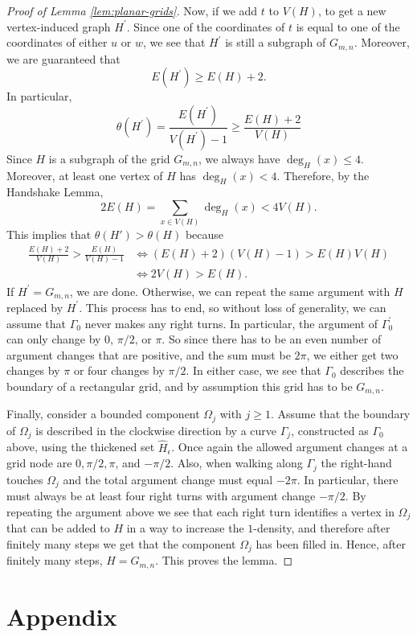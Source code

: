 \documentclass[preprint,12pt]{elsarticle}
\theoremstyle{definition}
\theoremstyle{remark}
\numberwithin{equation}{section}
\newcommand{\ep}{\epsilon }
\newcommand{\Ga}{\Gamma }
\newcommand{\Om}{\Omega }
\begin{document}
\begin{proof}[Proof of Lemma \ref{lem:planar-grids}]
Now, if we add $t$ to $V(H)$, to get a new vertex-induced graph $H^\prime$. Since one of the coordinates of $t$ is equal to one of the coordinates of either $u$ or $w$, we see that $H^\prime$ is still a subgraph of $G_{m,n}$. Moreover, we are guaranteed that 
\[
E(H^\prime)\ge E(H)+2.
\] 
In particular,
\[
\theta(H^\prime)= \frac{E(H^\prime)}{V(H^\prime)-1}\ge\frac{E(H)+2}{V(H)}
\]
Since $H$ is a subgraph of the grid $G_{m,n}$, we always have $\deg_H(x)\le 4$. Moreover, at least one vertex of $H$ has $\deg_H(x)<4$. Therefore, by the Handshake Lemma,
\[
2E(H)=\sum_{x\in V(H)}\deg_H(x)<4 V(H).
\]
This implies that $\theta(H')>\theta(H)$ because
\begin{align*}
 \frac{E(H)+2}{V(H)} >\frac{E(H)}{V(H)-1}
& \Longleftrightarrow (E(H)+2)(V(H)-1)> E(H)V(H)\\
& \Longleftrightarrow 2V(H)> E(H).
\end{align*}
If $H^\prime=G_{m,n}$, we are done. Otherwise, we can repeat the same argument with $H$ replaced by $H^\prime$. This process has to end, so without loss of generality, we can assume that $\Ga_0$ never makes any right turns. In particular, the argument of $\Ga_0^\prime$ can only change by $0$, $\pi/2$, or $\pi$. So since there has to be an even number of argument changes that are positive, and the sum must be $2\pi$, we either get two changes by $\pi$ or four changes by $\pi/2$. In either case, we see that $\Ga_0$ describes the boundary of  a rectangular grid, and by assumption this grid has to be $G_{m,n}$.

Finally, consider a bounded component $\Om_j$ with $j\ge 1$. Assume that the boundary of $\Om_j$ is described in the clockwise direction by a curve $\Ga_j$, constructed as $\Ga_0$ above, using the thickened set $\hat{H}_\ep$. Once again the allowed argument changes at a grid node are $0,\pi/2,\pi$, and $-\pi/2$. Also, when walking along $\Ga_j$ the right-hand touches $\Om_j$ and the total argument change must equal $-2\pi$. In particular, there must always be at least four right turns with argument change $-\pi/2$. By repeating the argument above we see that each right turn identifies a vertex in $\Om_j$ that can be added to $H$ in a way to increase the $1$-density, and therefore after finitely many steps we get that the component $\Om_j$ has been filled in. Hence, after finitely many steps, $H=G_{m,n}$. This proves the lemma.
\end{proof}

\section{Appendix}
\end{document}
